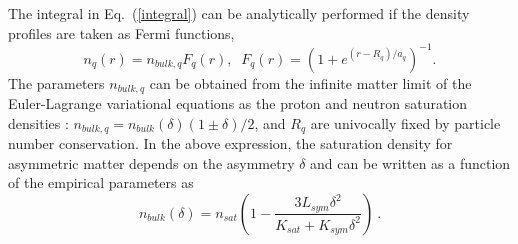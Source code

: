 \documentclass
[aps,prc,twocolumn,showpacs,showkeys,amsmath,floatfix,superscriptaddress]{revtex4}
\begin{document}
The integral in Eq.~(\ref{integral}) can be analytically performed if the density profiles are taken as Fermi functions,
\begin{equation}
 n_q(r) =  n_{bulk,q} F_q(r), \;\; F_q(r) = (1+e^{(r-R_q)/a_q})^{-1}.\label{eq:fermi}
\end{equation}
The  parameters $n_{bulk,q}$ can be obtained from the infinite matter limit of the Euler-Lagrange variational equations \cite{krivine} as the proton and neutron saturation densities \cite{Panagiota}:
$n_{bulk,q} = n_{bulk} (\delta) (1 \pm \delta)/2$, and $R_q$ are univocally fixed by particle number conservation. 
In the above expression, the saturation density for asymmetric matter depends on the asymmetry $\delta$ and can be written as a function of the 
empirical parameters as~\cite{Panagiota}
\begin{equation}
n_{bulk} (\delta) =  n_{sat} \left( 1 - \frac{3 L_{sym}\delta^2}{K_{sat} + K_{sym} \delta^2} \right)~.  \label{rho0}
\end{equation}\\
\end{document}
